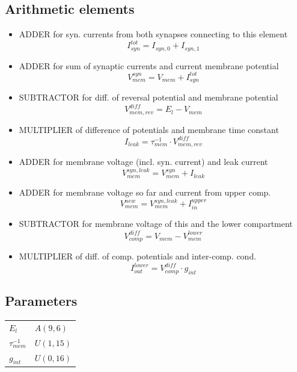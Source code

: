 \documentclass[a4paper]{report}
\begin{document}
\subsection{Arithmetic elements}
\begin{itemize}
	\item ADDER for syn. currents from both synapses connecting to this element
		\begin{equation}
			I_{syn}^{tot} = I_{syn,0} + I_{syn,1}
		\end{equation}
	\item ADDER for sum of synaptic currents and current membrane potential
		\begin{equation}
			V_{mem}^{syn} = V_{mem} + I_{syn}^{tot}
		\end{equation}
	\item SUBTRACTOR for diff. of reversal potential and membrane potential
		\begin{equation}
			V_{mem,rev}^{diff} = E_l - V_{mem}
		\end{equation}
	\item MULTIPLIER of difference of potentials and membrane time constant
		\begin{equation}
			I_{leak} = \tau_{mem}^{-1} \cdot V_{mem,rev}^{diff}
		\end{equation}
	\item ADDER for membrane voltage (incl. syn. current) and leak current
		\begin{equation}
			V_{mem}^{syn,leak} = V_{mem}^{syn} + I_{leak}
		\end{equation}
	\item ADDER for membrane voltage so far and current from upper comp.
		\begin{equation}
			V_{mem}^{new} = V_{mem}^{syn,leak} + I_{in}^{upper}
		\end{equation}
	\item SUBTRACTOR for membrane voltage of this and the lower compartment
		\begin{equation}
			V_{comp}^{diff} = V_{mem} - V_{mem}^{lower}
		\end{equation}
	\item MULTIPLIER of diff. of comp. potentials and inter-comp. cond.
		\begin{equation}
			I_{out}^{lower} = V_{comp}^{diff} \cdot g_{int}
		\end{equation}
\end{itemize}
\subsection{Parameters}
\begin{tabular}{ll}
$E_l$ & $A(9,6)$\\
$\tau_{mem}^{-1}$ & $U(1,15)$\\
$g_{int}$ & $U(0,16)$\\
\end{tabular}
\end{document}
